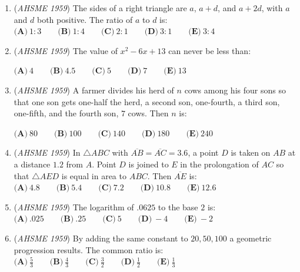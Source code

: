 \begin{enumerate}
 $\textbf{(A)}\ \text{only the converse is true} \qquad \\ \textbf{(B)}\ \text{only the inverse is true }\qquad  \\ \textbf{(C)}\ \text{both are true} \qquad \\ \textbf{(D)}\ \text{neither is true} \qquad \\ \textbf{(E)}\ \text{the inverse is true, but the converse is sometimes true}$


	\item (\textit{AHSME 1959}) The sides of a right triangle are $a$, $a+d$, and $a+2d$, with $a$ and $d$ both positive. The ratio of $a$ to $d$ is:
$\textbf{(A)}\ 1:3 \qquad\textbf{(B)}\ 1:4 \qquad\textbf{(C)}\ 2:1\qquad\textbf{(D)}\ 3:1\qquad\textbf{(E)}\ 3:4$


	\item (\textit{AHSME 1959}) The value of $x^2-6x+13$ can never be less than:


 $\textbf{(A)}\ 4 \qquad \textbf{(B)}\ 4.5 \qquad \textbf{(C)}\ 5\qquad \textbf{(D)}\ 7\qquad \textbf{(E)}\ 13$


	\item (\textit{AHSME 1959}) A farmer divides his herd of $n$ cows among his four sons so that one son gets one-half the herd, 
a second son, one-fourth, a third son, one-fifth, and the fourth son, $7$ cows. Then $n$ is:


 $\textbf{(A)}\ 80 \qquad\textbf{(B)}\ 100\qquad\textbf{(C)}\ 140\qquad\textbf{(D)}\ 180\qquad\textbf{(E)}\ 240$


	\item (\textit{AHSME 1959}) In $\triangle ABC$ with $\overline{AB}=\overline{AC}=3.6$, a point $D$ is taken on $AB$ at a distance $1.2$ from $A$. 
Point $D$ is joined to $E$ in the prolongation of $AC$ so that $\triangle AED$ is equal in area to $ABC$. Then $\overline{AE}$ is:
$\textbf{(A)}\ 4.8 \qquad\textbf{(B)}\ 5.4\qquad\textbf{(C)}\ 7.2\qquad\textbf{(D)}\ 10.8\qquad\textbf{(E)}\ 12.6$


	\item (\textit{AHSME 1959}) The logarithm of $.0625$ to the base $2$ is:
$\textbf{(A)}\ .025 \qquad\textbf{(B)}\ .25\qquad\textbf{(C)}\ 5\qquad\textbf{(D)}\ -4\qquad\textbf{(E)}\ -2$


	\item (\textit{AHSME 1959}) By adding the same constant to $20,50,100$ a geometric progression results. The common ratio is:
$\textbf{(A)}\ \frac53 \qquad\textbf{(B)}\ \frac43\qquad\textbf{(C)}\ \frac32\qquad\textbf{(D)}\ \frac12\qquad\textbf{(E)}\ \frac{1}3$



\end{enumerate}
